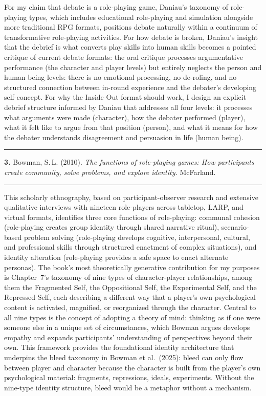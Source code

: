 \documentclass[11pt, a4paper]{article}
\newcommand{\entry}[3]{%
  \vspace{1.8em}
  {\color{rulegray}\rule{\linewidth}{0.4pt}}
  \vspace{0.5em}

  \noindent
  {\large\bfseries\color{accent}#1.}\enspace
  {\normalsize #2}%
  \enspace{\small\scshape\color{taggray}[#3]}

  \vspace{0.35em}
  {\color{accent}\rule{\linewidth}{1.2pt}}
  \vspace{0.2em}
}
\begin{document}
For my claim that debate is a role-playing game, Daniau's taxonomy of
role-playing types, which includes educational role-playing and simulation
alongside more traditional RPG formats, positions debate naturally within a
continuum of transformative role-playing activities. For how debate is broken,
Daniau's insight that the debrief is what converts play skills into human skills
becomes a pointed critique of current debate formats: the oral critique
processes argumentative performance (the character and player levels) but
entirely neglects the person and human being levels: there is no emotional
processing, no de-roling, and no structured connection between in-round
experience and the debater's developing self-concept. For why the Inside Out
format should work, I design an explicit debrief structure informed by Daniau
that addresses all four levels: it processes what arguments were made
(character), how the debater performed (player), what it felt like to argue
from that position (person), and what it means for how the debater understands
disagreement and persuasion in life (human being).

\entry{3}{Bowman, S.\,L. (2010). \textit{The functions of role-playing games: How participants
create community, solve problems, and explore identity.} McFarland.}{Theoretical Framework}

This scholarly ethnography, based on participant-observer research and
extensive qualitative interviews with nineteen role-players across tabletop,
LARP, and virtual formats, identifies three core functions of role-playing:
communal cohesion (role-playing creates group identity through shared narrative
ritual), scenario-based problem solving (role-playing develops cognitive,
interpersonal, cultural, and professional skills through structured enactment
of complex situations), and identity alteration (role-playing provides a safe
space to enact alternate personas). The book's most theoretically generative
contribution for my purposes is Chapter~7's taxonomy of nine types of
character-player relationships, among them the Fragmented Self, the Oppositional
Self, the Experimental Self, and the Repressed Self, each describing a
different way that a player's own psychological content is activated, magnified,
or reorganized through the character. Central to all nine types is the concept
of adopting a theory of mind: thinking as if one were someone else in a unique
set of circumstances, which Bowman argues develops empathy and expands
participants' understanding of perspectives beyond their own. This framework
provides the foundational identity architecture that underpins the bleed
taxonomy in Bowman et al.\ (2025): bleed can only flow between player and
character because the character is built from the player's own psychological
material: fragments, repressions, ideals, experiments. Without the nine-type
identity structure, bleed would be a metaphor without a mechanism.
\end{document}
